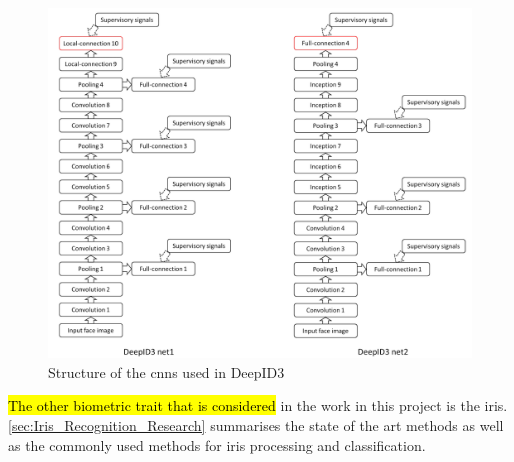 \begin{figure}[h]
	\centering
	\includegraphics[width=\textwidth]{figures/deepid3_net}
	\caption{Structure of the \gls{cnn}s used in DeepID3 \citep{sun2015}}
	\label{fig:deepid3_net}
\end{figure}

\hl{The other biometric trait that is considered} in the work in this project is the iris. \autoref{sec:Iris_Recognition_Research} summarises the state of the art methods as well as the commonly used methods for iris processing and classification.  